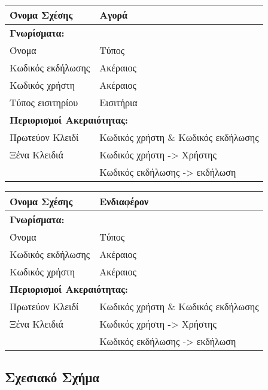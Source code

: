 \begin{tabular}{|p{6cm}|p{8cm}|}
  \hline
  Όνομα Σχέσης      & Αγορά                                \\ \hline
  \multicolumn{2}{|l|}{\textbf{Γνωρίσματα:}}               \\ \hline
  Όνομα             & Τύπος                                \\ \hline
  Κωδικός εκδήλωσης & Ακέραιος                             \\ \hline
  Κωδικός χρήστη    & Ακέραιος                             \\ \hline
  Τύπος εισιτηρίου  & Εισιτήρια                            \\ \hline
  \multicolumn{2}{|l|}{\textbf{Περιορισμοί Ακεραιότητας:}} \\ \hline
  Πρωτεύον Κλειδί   & Κωδικός χρήστη \& Κωδικός εκδήλωσης  \\ \hline
  Ξένα Κλειδιά      & Κωδικός χρήστη -> Χρήστης            \\ \hline
                    & Κωδικός εκδήλωσης -> εκδήλωση        \\ \hline
\end{tabular}

\begin{tabular}{|p{6cm}|p{8cm}|}
  \hline
  Όνομα Σχέσης      & Ενδιαφέρον                           \\ \hline
  \multicolumn{2}{|l|}{\textbf{Γνωρίσματα:}}               \\ \hline
  Όνομα             & Τύπος                                \\ \hline
  Κωδικός εκδήλωσης & Ακέραιος                             \\ \hline
  Κωδικός χρήστη    & Ακέραιος                             \\ \hline
  \multicolumn{2}{|l|}{\textbf{Περιορισμοί Ακεραιότητας:}} \\ \hline
  Πρωτεύον Κλειδί   & Κωδικός χρήστη \& Κωδικός εκδήλωσης  \\ \hline
  Ξένα Κλειδιά      & Κωδικός χρήστη -> Χρήστης            \\ \hline
                    & Κωδικός εκδήλωσης -> εκδήλωση        \\ \hline
\end{tabular}



\subsection{Σχεσιακό Σχήμα}

